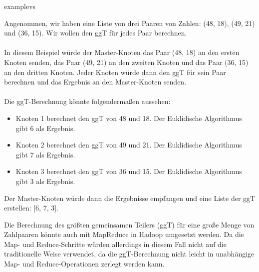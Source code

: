 examplevs{
Angenommen, wir haben eine Liste von drei Paaren von Zahlen: (48, 18), (49, 21) und (36, 15). Wir wollen den ggT für jedes Paar berechnen.
\\\\
In diesem Beispiel würde der Master-Knoten das Paar (48, 18) an den ersten Knoten senden, das Paar (49, 21) an den zweiten Knoten und das Paar (36, 15) an den dritten Knoten. Jeder Knoten würde dann den ggT für sein Paar berechnen und das Ergebnis an den Master-Knoten senden.
\\\\
Die ggT-Berechnung könnte folgendermaßen aussehen:
\begin{itemize}
\item Knoten 1 berechnet den ggT von 48 und 18. Der Euklidische Algorithmus gibt 6 als Ergebnis.
\item Knoten 2 berechnet den ggT von 49 und 21. Der Euklidische Algorithmus gibt 7 als Ergebnis.
\item Knoten 3 berechnet den ggT von 36 und 15. Der Euklidische Algorithmus gibt 3 als Ergebnis.
\end{itemize}
Der Master-Knoten würde dann die Ergebnisse empfangen und eine Liste der ggT erstellen: [6, 7, 3].
}
Die Berechnung des größten gemeinsamen Teilers (ggT) für eine große Menge von Zahlpaaren könnte auch mit MapReduce in Hadoop umgesetzt werden. Da die Map- und Reduce-Schritte würden allerdings in diesem Fall nicht auf die traditionelle Weise verwendet, da die ggT-Berechnung nicht leicht in unabhängige Map- und Reduce-Operationen zerlegt werden kann.

